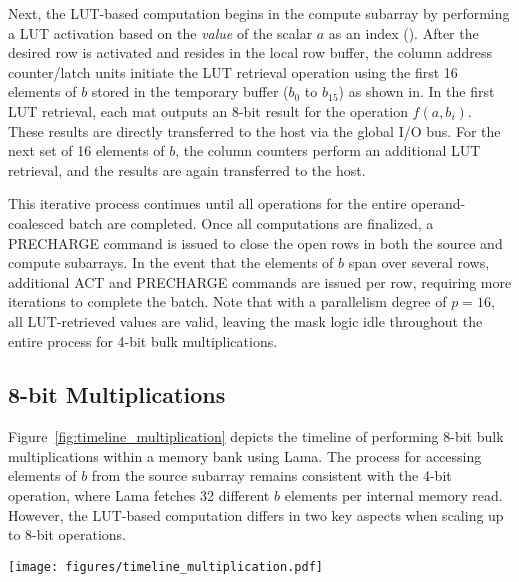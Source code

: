 
Next, the LUT-based computation begins in the compute subarray by performing a LUT activation based on the \textit{value} of the scalar $a$ as an index (). After the desired row is activated and resides in the local row buffer, the column address counter/latch units initiate the LUT retrieval operation using the first 16 elements of $b$ stored in the temporary buffer ($b_{0}$ to $b_{15}$) as shown in. In the first LUT retrieval, each mat outputs an 8-bit result for the operation $f(a,b_{i})$. These results are directly transferred to the host via the global I/O bus. For the next set of 16 elements of $b$, the column counters perform an additional LUT retrieval, and the results are again transferred to the host.

This iterative process continues until all operations for the entire operand-coalesced batch are completed. Once all computations are finalized, a PRECHARGE command is issued to close the open rows in both the source and compute subarrays. In the event that the elements of $b$ span over several rows, additional ACT and PRECHARGE commands are issued per row, requiring more iterations to complete the batch. Note that with a parallelism degree of $p = 16$, all LUT-retrieved values are valid, leaving the mask logic idle throughout the entire process for 4-bit bulk multiplications.


\subsection{8-bit Multiplications}
Figure~\ref{fig:timeline_multiplication} depicts the timeline of performing 8-bit bulk multiplications within a memory bank using Lama. The process for accessing elements of $b$ from the source subarray remains consistent with the 4-bit operation, where Lama fetches 32 different $b$ elements per internal memory read. However, the LUT-based computation differs in two key aspects when scaling up to 8-bit operations.

\begin{figure*}[t!]
\centering
\texttt{[image: figures/timeline\_multiplication.pdf]}
\caption{Timeline of performing multiplications using Lama. Each read operation includes two internal column accesses (ICA). The "M" block represents the latency of the mask logic. LUT retrieval includes one ICA followed by the mask logic. An ACT command is issued only once to access the row indexed by the scalar operand $a$ in both the source and compute subarrays. For subsequent iterations with new elements of $b$, no additional ACT commands are needed (indicated by the red block) due to the open-page policy.}
\label{fig:timeline_multiplication}
\vskip -0.15in
\end{figure*}

